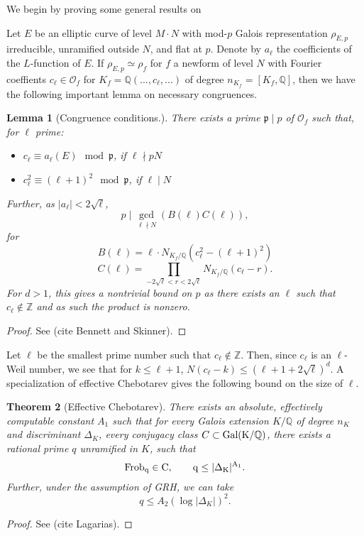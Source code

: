 \documentclass[12pt]{amsart}
\newtheorem{thm}{Theorem}[section]
\newtheorem{lem}[thm]{Lemma}
\theoremstyle{definition}
\def\O{{\mathcal O}}
\def\Q{{\mathbb Q}}
\newcommand{\Frob}{\rm Frob}
\newcommand{\Gal}{\rm Gal}
\begin{document}
We begin by proving some general results on 

Let $E$ be an elliptic curve of level $M \cdot N$ with mod-$p$ Galois representation $\rho_{E,p}$ irreducible, unramified outside $N$, and flat at $p$.  Denote by $a_\ell$ the coefficients of the $L$-function of $E$.  If $\rho_{E,p} \simeq \rho_f$ for $f$ a newform of level $N$ with Fourier coeffients $c_\ell\in \O_f$ for $K_f = \Q(...,c_\ell,...)$ of degree $n_{K_f} = [K_f,\mathbb{Q}]$, then we have the following important lemma on necessary congruences.

\begin{lem}[Congruence conditions.]\label{irnewbound1}
There exists a prime $\mathfrak{p} \mid p$ of $\mathcal{O}_f$ such that, for $\ell$ prime:
\begin{itemize}
\item $c_\ell \equiv a_\ell(E) \mod \mathfrak{p}$, if $\ell \nmid pN$
\item $c_\ell^2 \equiv (\ell+1)^2 \mod \mathfrak{p}$, if $\ell \mid N$
\end{itemize}
Further, as $|a_\ell| < 2\sqrt{\ell}$,
\[p \mid \gcd_{\ell \nmid N}(B(\ell)C(\ell)), \] for
\[B(\ell) = \ell \cdot N_{K_f / \mathbb{Q}}(c_\ell^2-(\ell+1)^2) \]
\[C(\ell) = \prod_{-2\sqrt{\ell} < r < 2\sqrt{\ell}}{N_{K_f / \mathbb{Q}}}(c_\ell - r).\]
For $d > 1$, this gives a nontrivial bound on $p$ as there exists an $\ell$ such that $c_\ell \notin \mathbb{Z}$ and as such the product is nonzero.
\end{lem}

\begin{proof}
See (cite Bennett and Skinner).
\end{proof}

Let $\ell$ be the smallest prime number such that $c_\ell \notin \mathbb{Z}$. Then, since $c_\ell$ is an $\ell$-Weil number, we see that for $k \leq \ell+1$, $N(c_\ell - k) \leq (\ell+1 + 2\sqrt{\ell})^d$.  A specialization of effective Chebotarev gives the following bound on the size of $\ell$.

\begin{thm}[Effective Chebotarev]\label{effcheb}
There exists an absolute, effectively computable constant $A_1$ such that for every Galois extension $K/\mathbb{Q}$ of degree $n_K$ and discriminant $\Delta_K$, every conjugacy class $C \subset \Gal(K/\mathbb{Q})$, there exists a rational prime $q$ unramified in $K$, such that 
\[\Frob_q \in C, \qquad q \leq |\Delta_K|^{A_1}. \]  
Further, under the assumption of GRH, we can take \[q \leq A_2 (\log |\Delta_K|)^2. \]
\end{thm}
\begin{proof}
See (cite Lagarias).
\end{proof}
\end{document}
